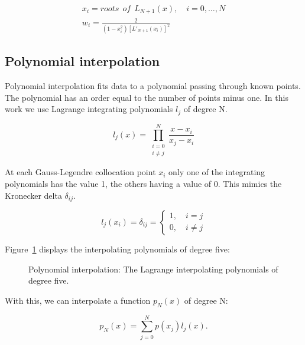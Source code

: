 \begin{gather}
    x_i = roots \: \: of \: \: L_{N + 1}(x), \quad i = 0, \ldots, N \\
    w_i = \frac{2}{(1-x_i^2) {\left[ L'_{N + 1}(x_i) \right]}^2}
\end{gather}

\subsection{Polynomial interpolation}\label{subsection:spectral_element_method:spectral_approximation:polynomial_interpolation}

Polynomial interpolation fits data to a polynomial passing through known points. The polynomial has
an order equal to the number of points minus one. In this work we use Lagrange integrating
polynomials \(l_j\) of degree N.

\begin{equation}
    l_j(x) = \prod_{\substack{i = 0 \\ i \neq j}}^{N}\frac{x- x_i}{x_j - x_i}
\end{equation}

At each Gauss-Legendre collocation point \(x_i\) only one of the integrating polynomials has the
value 1, the others having a value of 0. This mimics the Kronecker delta \(\delta_{i j}\).

\begin{equation}
    l_j(x_i) = \delta_{i j} = \left \{\begin{matrix}
    1, \quad i = j\\ 
    0, \quad i \neq j
    \end{matrix}\right.
\end{equation}

Figure~\ref{fig:interpolants} displays the interpolating polynomials of degree five:

\begin{figure}[H]
    \centering
    
    \caption{Polynomial interpolation: The Lagrange interpolating polynomials of degree five.}\label{fig:interpolants}
\end{figure}

With this, we can interpolate a function \(p_N(x)\) of degree N\@:

\begin{equation}
    p_N(x) = \sum_{j = 0}^{N}p(x_j)l_j(x).
\end{equation}


